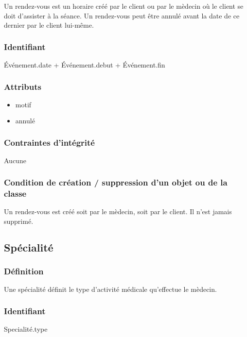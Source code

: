 \documentclass[a4paper, 11pt]{report}
\begin{document}
Un rendez-vous est un horaire créé par le client ou par le mèdecin où le client se doit 
d'assister à la séance.
Un rendez-vous peut être annulé avant la date de ce dernier par le client lui-même.

\subsubsection{Identifiant}

Événement.date + Événement.debut + Événement.fin

\subsubsection{Attributs}

\begin{itemize}
    \item motif
    \item annulé
\end{itemize}

\subsubsection{Contraintes d'intégrité}

Aucune

\subsubsection{Condition de création / suppression d'un objet ou de la classe}

Un rendez-vous est créé soit par le mèdecin, soit par le client. Il n'est jamais supprimé.

\subsection{Spécialité}

\subsubsection{Définition}

Une spécialité définit le type d'activité médicale qu'effectue le mèdecin.

\subsubsection{Identifiant}

Specialité.type
\end{document}

